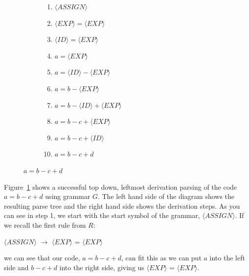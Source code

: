 \documentclass[ %
                    author={Jonathan Rankin},
                supervisor={Dr. David May, Dr. Ian Holyer},
                    degree={MEng},
                     title={CodeTouch},
                  subtitle={A Revolutionary Way To Program Real Code On Touch Screen Devices},
                      type={enterprise},
                      year={2015 } ]{dissertation}
\begin{document}
\begin{itemize}
\begin{figure}[h]
\begin{subfigure}{0.7\textwidth}
\end{subfigure}%
\begin{subfigure}{0.7\textwidth}
  \centering
        \begin{enumerate}
          \item $\langle ASSIGN \rangle    $\\      
            \item $\langle EXP \rangle = \langle EXP \rangle $\\
            \item $\langle ID \rangle = \langle EXP \rangle$ \\
            \item $a = \langle EXP \rangle $\\
            \item $a = \langle ID \rangle - \langle EXP \rangle $\\
            \item $a = b - \langle EXP \rangle $\\
            \item $a = b - \langle ID \rangle + \langle EXP \rangle $\\
            \item $a = b - c + \langle EXP \rangle $\\
            \item $a = b - c + \langle ID \rangle $\\
            \item $a = b - c + d $\\
        \end{enumerate}

\end{subfigure}
\caption{$a = b - c + d$}
\label{fig:success}
\end{figure}

Figure~\ref{fig:success} shows a successful top down, leftmost derivation parsing of the code $a = b - c + d$ using grammar $G$. The left hand side of the diagram shows the resulting parse tree and the right hand side shows the derivation steps. As you can see in step 1, we start with the start symbol of the grammar, $\langle ASSIGN \rangle$. If we recall the first rule from $R$:

\begin{center}
$\langle ASSIGN \rangle$ $\rightarrow$ $\langle EXP \rangle$ = $\langle EXP \rangle$
\end{center}
we can see that our code, $a = b - c + d$, can fit this as we can put $a$ into the left side and $b - c + d$ into the right side, giving us
$\langle EXP \rangle$ = $\langle EXP \rangle$.


\end{itemize}
\end{document}

